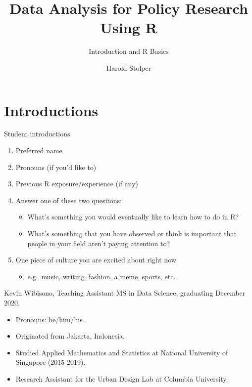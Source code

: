 \documentclass[
  8pt,
  ignorenonframetext,
  dvipsnames]{beamer}
\title{Data Analysis for Policy Research Using R}
\subtitle{Introduction and R Basics}
\author{Harold Stolper}
\date{}
\providecommand{\tightlist}{%
  \setlength{\itemsep}{0pt}\setlength{\parskip}{0pt}}
\let\olditem\item
\renewcommand{\item}{%
  \olditem\vspace{4pt}
}
\begin{document}
\frame{\titlepage}

\begin{frame}[allowframebreaks]
  \tableofcontents[hideallsubsections]
\end{frame}
\hypertarget{introductions}{%
\section{Introductions}\label{introductions}}

\begin{frame}{Student introductions}
\protect\hypertarget{student-introductions}{}
\begin{enumerate}
\tightlist
\item
  Preferred name
\item
  Pronouns (if you'd like to)
\item
  Previous R exposure/experience (if any)
\item
  Answer one of these two questions:

  \begin{itemize}
  \tightlist
  \item
    What's something you would eventually like to learn how to do in R?
  \item
    What's something that you have observed or think is important that
    people in your field aren't paying attention to?
  \end{itemize}
\item
  One piece of culture you are excited about right now

  \begin{itemize}
  \tightlist
  \item
    e.g.~music, writing, fashion, a meme, sports, etc.
  \end{itemize}
\end{enumerate}
\end{frame}

\begin{frame}{Kevin Wibisono, Teaching Assistant}
\protect\hypertarget{kevin-wibisono-teaching-assistant}{}
MS in Data Science, graduating December 2020.

\medskip

\begin{itemize}
\tightlist
\item
  Pronouns: he/him/his.
\item
  Originated from Jakarta, Indonesia.
\item
  Studied Applied Mathematics and Statistics at National University of
  Singapore (2015-2019).
\item
  Research Assistant for the Urban Design Lab at Columbia University.
\end{itemize}
\end{frame}
\end{document}
